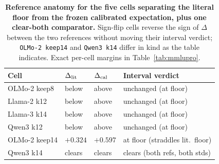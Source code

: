 \begin{table}[!htbp]
\centering
\small
\setlength{\tabcolsep}{4pt}
\begin{tabular}{@{}llll@{}}
\toprule
Cell & $\Delta_{\rm lit}$ & $\Delta_{\rm cal}$ & Interval verdict \\
\midrule
OLMo-2 keep8 & below & above & unchanged (at floor) \\
Llama-2 k12 & below & above & unchanged (at floor) \\
Llama-3 k14 & below & above & unchanged (at floor) \\
Qwen3 k12 & below & above & unchanged (at floor) \\
\midrule
OLMo-2 keep14 & $+0.324$ & $+0.597$ & at floor (straddles lit.\ floor) \\
Qwen3 k14 & clears & clears & clears (both refs, both stds) \\
\bottomrule
\end{tabular}
\caption{\textbf{Reference anatomy for the five cells separating the literal floor from the frozen calibrated expectation, plus one clear-both comparator.} Sign-flip cells reverse the sign of $\Delta$ between the two references without moving their interval verdict; \texttt{OLMo-2 keep14} and \texttt{Qwen3 k14} differ in kind as the table indicates. Exact per-cell margins in Table~\ref{tab:mmlupro}.}
\label{tab:reference-anatomy}
\end{table}
